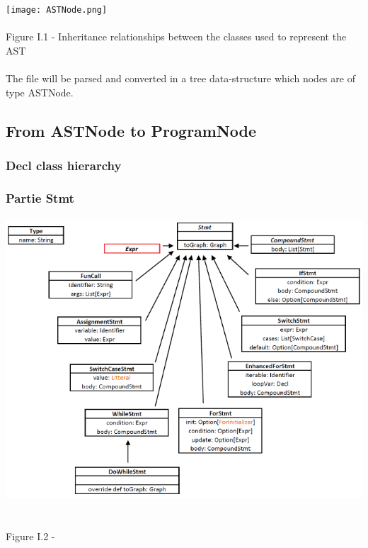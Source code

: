 \documentclass{report}
\begin{document}
\begin{center}
\texttt{[image: ASTNode.png]}
~\\~\\Figure I.1 - Inheritance relationships between the classes used to represent the AST
\end{center}

\paragraph{}
\hspace{4mm}\textnormal{The file will be parsed and converted in a tree data-structure which nodes are of type ASTNode.}

\subsection{From ASTNode to ProgramNode}

\subsubsection{\textbf{Decl} class hierarchy}

\subsubsection{Partie \textbf{Stmt}}

\paragraph{}
\hspace{4mm}\textnormal{}

\begin{center}
\includegraphics[scale=0.9]{data/stmt.png}
~\\~\\Figure I.2 - 
\end{center}
\end{document}
